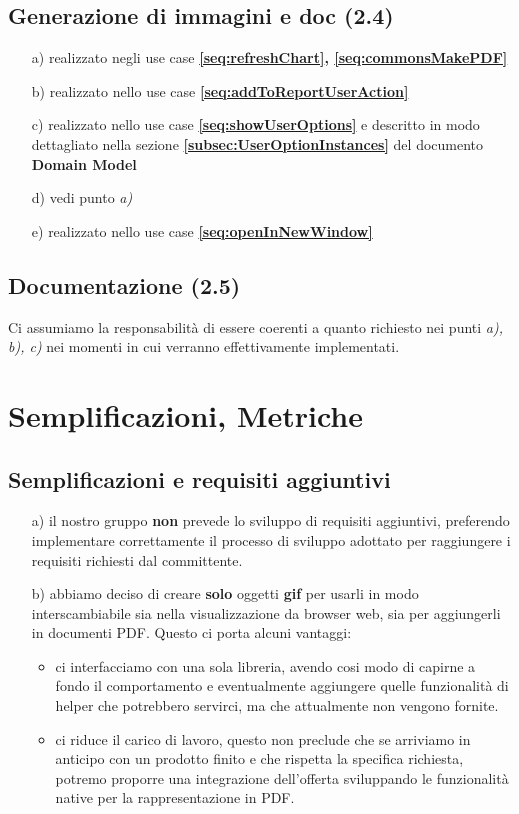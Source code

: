 \section{Generazione di immagini e doc (2.4)}
\begin{itemize}
  \item[a)] realizzato negli use case \textbf{\ref{seq:refreshChart},
  \ref{seq:commonsMakePDF}}
  \item[b)] realizzato nello use case \textbf{\ref{seq:addToReportUserAction}}
  \item[c)] realizzato nello use case \textbf{\ref{seq:showUserOptions}} e
  descritto in modo dettagliato nella sezione
  \textbf{\ref{subsec:UserOptionInstances}}  del documento \textbf{Domain Model}
  \item[d)] vedi punto \emph{a)}
  \item[e)] realizzato nello use case \textbf{\ref{seq:openInNewWindow}}
\end{itemize}

\section{Documentazione (2.5)}
Ci assumiamo la responsabilit\`a di essere coerenti a quanto richiesto nei
punti \emph{a), b), c)} nei momenti in cui verranno effettivamente implementati.

\chapter{Semplificazioni, Metriche}
\section{Semplificazioni e requisiti aggiuntivi}
\begin{itemize}
  \item[a)] il nostro gruppo \textbf{non} prevede lo sviluppo di requisiti
  aggiuntivi, preferendo implementare correttamente il processo di sviluppo 
  adottato per raggiungere i requisiti richiesti dal committente.
  \item[b)] abbiamo deciso di creare \textbf{solo} oggetti \textbf{gif} per
  usarli in modo interscambiabile sia nella visualizzazione da browser web, sia
  per aggiungerli in documenti PDF. Questo ci porta alcuni vantaggi:
  \begin{itemize}
    \item ci interfacciamo con una sola libreria, avendo cosi modo di capirne a
    fondo il comportamento e eventualmente aggiungere quelle funzionalit\`a di
    helper che potrebbero servirci, ma che attualmente non vengono fornite.
    \item ci riduce il carico di lavoro, questo non preclude che se arriviamo
    in anticipo con un prodotto finito e che rispetta la specifica richiesta,
    potremo proporre una integrazione dell'offerta sviluppando le
    funzionalit\`a native per la rappresentazione in PDF.
    \end{itemize}
\end{itemize}

